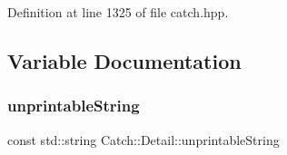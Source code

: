 Definition at line 1325 of file catch.\+hpp.



\subsection{Variable Documentation}
\mbox{\label{namespace_catch_1_1_detail_a466775f4eec29ffef29ab334cd885136}} 
\subsubsection{unprintableString}
{\footnotesize\ttfamily const std\+::string Catch\+::\+Detail\+::unprintable\+String}

